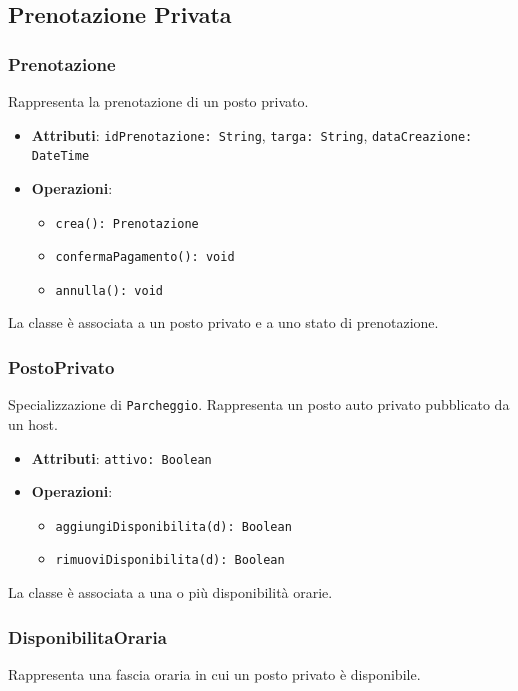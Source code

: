 \documentclass[12pt,a4paper]{article}
\begin{document}
\subsection{Prenotazione Privata}

\subsubsection{Prenotazione}
Rappresenta la prenotazione di un posto privato.

\begin{itemize}
    \item \textbf{Attributi}: \texttt{idPrenotazione: String}, \texttt{targa: String}, \texttt{dataCreazione: DateTime}
    \item \textbf{Operazioni}:
    \begin{itemize}
        \item \texttt{crea(): Prenotazione}
        \item \texttt{confermaPagamento(): void}
        \item \texttt{annulla(): void}
    \end{itemize}
\end{itemize}

La classe è associata a un posto privato e a uno stato di prenotazione.

\subsubsection{PostoPrivato}
Specializzazione di \texttt{Parcheggio}. Rappresenta un posto auto privato pubblicato da un host.

\begin{itemize}
    \item \textbf{Attributi}: \texttt{attivo: Boolean}
    \item \textbf{Operazioni}:
    \begin{itemize}
        \item \texttt{aggiungiDisponibilita(d): Boolean}
        \item \texttt{rimuoviDisponibilita(d): Boolean}
    \end{itemize}
\end{itemize}

La classe è associata a una o più disponibilità orarie.

\subsubsection{DisponibilitaOraria}
Rappresenta una fascia oraria in cui un posto privato è disponibile.
\end{document}
